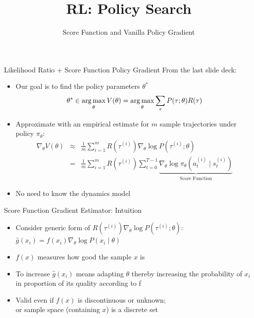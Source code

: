 \documentclass[aspectratio=169]{../latex_main/tntbeamer}  %
\title[RL: Score Function and Vanilla GP]{RL: Policy Search}
\subtitle{Score Function and Vanilla Policy Gradient}
\begin{document}
	
	\maketitle

\begin{frame}[c]{Likelihood Ratio + Score Function Policy Gradient}
From the last slide deck:
	\begin{itemize}
		\item Our goal is to find the policy parameters $\theta^*$
		$$\theta^* \in \operatorname*{arg\,max}_{\theta} V(\theta) = \operatorname*{arg\,max}_{\theta}\sum_{\tau} P(\tau; \theta) R(\tau) $$
		\item Approximate with an empirical estimate for $m$ sample trajectories under
		policy $\pi_\theta$:
		\begin{eqnarray}
		\nabla_\theta V(\theta) &\approx& \frac{1}{m} \sum_{i=1}^{m} R(\tau^{(i)}) \nabla_\theta \log P(\tau^{(i)}; \theta) \nonumber\\
		&=& \frac{1}{m} \sum_{i=1}^{m} R(\tau^{(i)}) \sum_{t=0}^{T-1} \underbrace{\nabla_\theta \log \pi_\theta (a_t^{(i)} \mid s_t^{(i)})}_{\text{Score Function}}
		\end{eqnarray}
		\item No need to know the dynamics model
		
	\end{itemize}
	
\end{frame}
\begin{frame}[c]{Score Function Gradient Estimator: Intuition}
	
	\begin{itemize}
		\item Consider generic form of $R(\tau^{(i)}) \nabla_\theta \log P(\tau^{(i)}; \theta)$:\\
		$\hat{g}(x_i) = f(x_i) \nabla_\theta \log P(x_i \mid \theta)$
		\item $f(x)$ measures how good the sample $x$ is
		\item To increase $\hat{g}(x_i)$ means adapting $\theta$ thereby increasing the probability of $x_i$\\ in proportion of its quality according to f
		\item Valid even if $f(x)$ is discontinuous or unknown;\\ or sample space (containing $x$) is a discrete set
	\end{itemize}
	
\end{frame}
\end{document}
